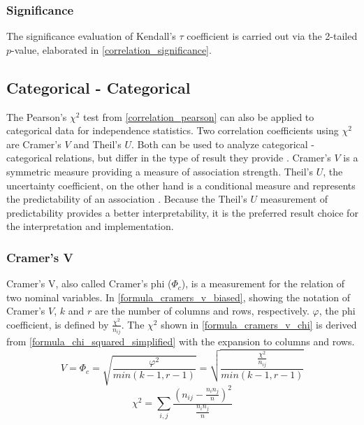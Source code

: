 \subsubsection{Significance}
The significance evaluation of Kendall's $\tau$ coefficient is carried out via the 2-tailed $p$-value, elaborated in \cref{correlation_significance}.

\subsection{Categorical - Categorical}
The Pearson's $\chi^2$ test from \cref{correlation_pearson} can also be applied to categorical data for independence statistics. Two correlation coefficients using $\chi^2$ are Cramer’s $V$ and Theil’s $U$. Both can be used to analyze categorical - categorical relations, but differ in the type of result they provide \parencite{OutsideTwoStandardDeviations2018}. Cramer’s $V$ is a symmetric measure providing a measure of association strength. Theil’s $U$, the uncertainty coefficient, on the other hand is a conditional measure and represents the predictability of an association \parencite{Akoglu2018,StackExchange2020}. Because the Theil’s $U$ measurement of predictability provides a better interpretability, it is the preferred  result choice for the interpretation and implementation. 

\subsubsection{Cramer’s V}

Cramer’s V, also called Cramer's phi ($\Phi_c$), is a measurement for the relation of two nominal variables. In \cref{formula_cramers_v_biased}, showing the notation of Cramer’s $V$, $k$ and $r$ are the number of columns and rows, respectively. $\varphi$, the phi coefficient, is defined by $\frac{{\chi^2}}{n_{ij}}$. The $\chi^2$ shown in \cref{formula_cramers_v_chi} is derived from \cref{formula_chi_squared_simplified} with the expansion to columns and rows. \parencite{Sheskin1997,Bergsma2013}
\smallskip
\begin{equation}
\label{formula_cramers_v_biased}
	V = \Phi_c =  \sqrt{\frac{{\varphi^2}}{min(k-1,r-1)}} = \sqrt{\frac{\frac{{\chi^2}}{n_{ij}}}{min(k-1,r-1)}}
\end{equation}
\begin{equation}
\label{formula_cramers_v_chi}
	\chi^2 =  \sum_{i,j}{\frac{(n_{ij}-\frac{n_i n_j}{n})^2}{\frac{n_i n_j}{n}}}
\end{equation}

